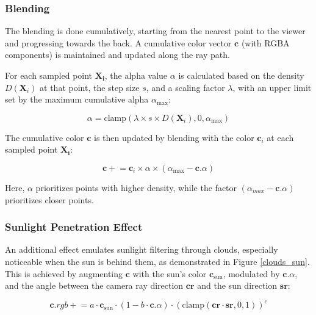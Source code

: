 \subsubsection{Blending}
\label{Cloud Blending}

The blending is done cumulatively, starting from the nearest point to the viewer and progressing towards the back. A cumulative color vector $\mathbf{c}$ (with RGBA components) is maintained and updated along the ray path.

For each sampled point $\mathbf{X_i}$, the alpha value $\alpha$ is calculated based on the density $D(\mathbf{X}_i)$ at that point, the step size $s$, and a scaling factor $\lambda$, with an upper limit set by the maximum cumulative alpha $\alpha_{\text{max}}$:

\begin{equation}
  \alpha = \text{clamp}(\lambda \times s \times D(\mathbf{X}_i), 0, \alpha_{\text{max}})
\end{equation}

The cumulative color $\mathbf{c}$ is then updated by blending with the color $\mathbf{c}_i$ at each sampled point $\mathbf{X_i}$:
  
\begin{equation}
  \mathbf{c} \mathrel{+}= \mathbf{c}_i \times \alpha \times (\alpha_{\text{max}} - \mathbf{c}.\alpha)
\end{equation}

Here, $\alpha$ prioritizes points with higher density, while the factor $(\alpha_{max} - \mathbf{c}.\alpha)$ prioritizes closer points. 


\subsubsection{Sunlight Penetration Effect}

An additional effect emulates sunlight filtering through clouds, especially noticeable when the sun is behind them, as demonstrated in Figure \ref{clouds_sun}. This is achieved by augmenting $\mathbf{c}$ with the sun's color $\mathbf{c}_{\text{sun}}$, modulated by $\mathbf{c}.\alpha$, and the angle between the camera ray direction $\mathbf{cr}$ and the sun direction $\mathbf{sr}$:

\begin{equation}
  \mathbf{c}.rgb \mathrel{+}= a \cdot \mathbf{c}_{\text{sun}} \cdot (1 - b \cdot \mathbf{c}.\alpha) \cdot (\text{clamp}(\mathbf{cr} \cdot \mathbf{sr}, 0, 1))^ c
\end{equation}

